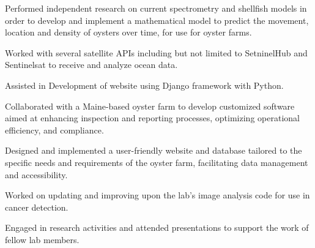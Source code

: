 \documentclass[letterpaper]{AMcEnaneyResume} %
\begin{document}
\begin{minipage}[t]{0.66\textwidth}


        \begin{tightitemize}
            \item Performed independent research on current spectrometry and shellfish models in order to develop and implement a mathematical model to predict the movement, location and density of oysters over time, for use for oyster farms.
            \item Worked with several satellite APIs including but not limited to SetninelHub and Sentinelsat to receive and analyze ocean data.
            \item Assisted in Development of website using Django framework with Python.
        \end{tightitemize}

        \sectionspace %



        \begin{tightitemize}
            \item Collaborated with a Maine-based oyster farm to develop customized software aimed at enhancing inspection and reporting processes, optimizing operational efficiency, and compliance.
            \item Designed and implemented a user-friendly website and database tailored to the specific needs and requirements of the oyster farm, facilitating data management and accessibility.
        \end{tightitemize}

        \sectionspace %



        \begin{tightitemize}
            \item Worked on updating and improving upon the lab's image analysis code for use in cancer detection.
            \item Engaged in research activities and attended presentations to support the work of fellow lab members.
        \end{tightitemize}


\end{minipage}
\end{document}
